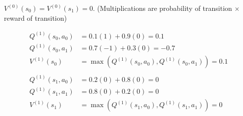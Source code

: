 $V^{(0)}(s_0) = V^{(0)}(s_1) = 0$. (Multiplications are probability of transition $\times$ reward of transition)

\begin{align*}
    Q^{(1)}(s_0, a_0) &= 0.1 (1) + 0.9 (0) = 0.1\\
    Q^{(1)}(s_0, a_1) &= 0.7 (-1) + 0.3 (0) = -0.7\\
    V^{(1)}(s_0) &= \max (Q^{(1)}(s_0, a_0), Q^{(1)}(s_0, a_1)) = 0.1\\\\
    Q^{(1)}(s_1, a_0) &= 0.2 (0) + 0.8 (0) = 0\\
    Q^{(1)}(s_1, a_1) &= 0.8 (0) + 0.2 (0) = 0\\
    V^{(1)}(s_1) &= \max (Q^{(1)}(s_1, a_0), Q^{(1)}(s_1, a_1)) = 0
\end{align*}